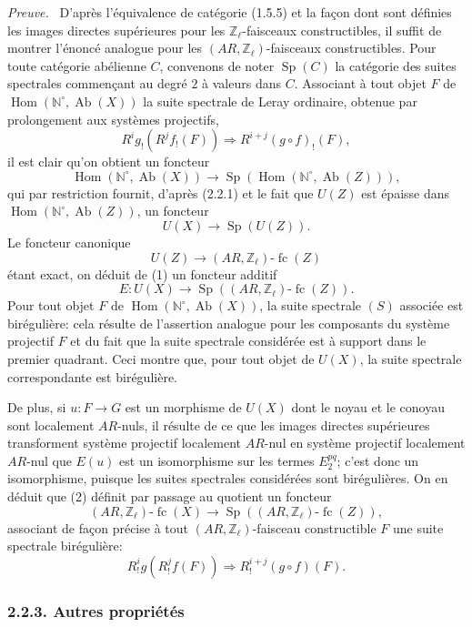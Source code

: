 \documentclass[11pt]{article}
\newenvironment{prooftext}[1][Proof]{\par\noindent\emph{#1.}\ }{\par\medskip}
\DeclareMathOperator{\Hom}{Hom}
\providecommand{\Hom}{\operatorname{Hom}}
\providecommand{\Sp}{\operatorname{Sp}}
\providecommand{\Ab}{\operatorname{Ab}}
\providecommand{\fc}{\operatorname{fc}}
\begin{document}
\begin{prooftext}[Preuve]
D'après l'équivalence de catégorie (1.5.5) et la façon dont sont définies les images directes supérieures pour les \(\mathbb Z_\ell\)-faisceaux constructibles, il suffit de montrer l'énoncé analogue pour les \((AR,\mathbb Z_\ell)\)-faisceaux constructibles. Pour toute catégorie abélienne \(C\), convenons de noter \(\Sp(C)\) la catégorie des suites spectrales commençant au degré \(2\) à valeurs dans \(C\). Associant à tout objet \(F\) de \(\Hom(\mathbb N^\circ,\Ab(X))\) la suite spectrale de Leray ordinaire, obtenue par prolongement aux systèmes projectifs,
\[
R^i g_!(R^j f_!(F))\Longrightarrow R^{i+j}(g\circ f)_!(F),
\tag{S}
\]
il est clair qu'on obtient un foncteur
\[
\Hom(\mathbb N^\circ,\Ab(X))\longrightarrow \Sp(\Hom(\mathbb N^\circ,\Ab(Z))),
\]
qui par restriction fournit, d'après (2.2.1) et le fait que \(U(Z)\) est épaisse dans \(\Hom(\mathbb N^\circ,\Ab(Z))\), un foncteur
\[
U(X)\longrightarrow \Sp(U(Z)).
\tag{1}
\]
Le foncteur canonique
\[
U(Z)\longrightarrow (AR,\mathbb Z_\ell)\text{-}\fc(Z)
\]
étant exact, on déduit de (1) un foncteur additif
\[
E:U(X)\longrightarrow \Sp((AR,\mathbb Z_\ell)\text{-}\fc(Z)).
\tag{2}
\]
Pour tout objet \(F\) de \(\Hom(\mathbb N^\circ,\Ab(X))\), la suite spectrale \((S)\) associée est birégulière: cela résulte de l'assertion analogue pour les composants du système projectif \(F\) et du fait que la suite spectrale considérée est à support dans le premier quadrant. Ceci montre que, pour tout objet de \(U(X)\), la suite spectrale correspondante est birégulière.

De plus, si \(u:F\to G\) est un morphisme de \(U(X)\) dont le noyau et le conoyau sont localement \(AR\)-nuls, il résulte de ce que les images directes supérieures transforment système projectif localement \(AR\)-nul en système projectif localement \(AR\)-nul que \(E(u)\) est un isomorphisme sur les termes \(E_2^{pq}\); c'est donc un isomorphisme, puisque les suites spectrales considérées sont birégulières. On en déduit que (2) définit par passage au quotient un foncteur
\[
(AR,\mathbb Z_\ell)\text{-}\fc(X)
\longrightarrow \Sp((AR,\mathbb Z_\ell)\text{-}\fc(Z)),
\tag{3}
\]
associant de façon précise à tout \((AR,\mathbb Z_\ell)\)-faisceau constructible \(F\) une suite spectrale birégulière:
\[
R^i_!g(R^j_!f(F))\Longrightarrow R^{i+j}_!(g\circ f)(F).
\]
\end{prooftext}

\subsubsection*{2.2.3. Autres propriétés}
\end{document}
